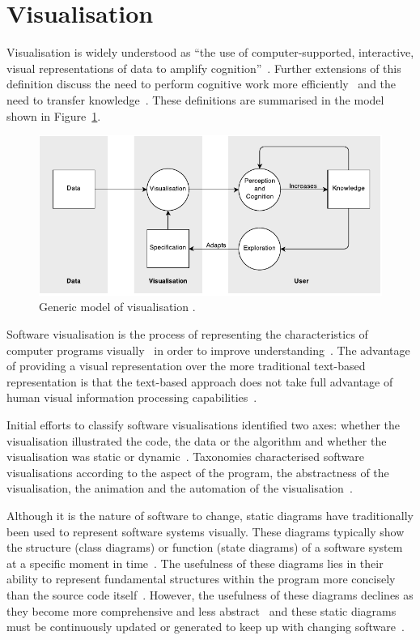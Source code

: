 \section{Visualisation}

Visualisation is widely understood as ``the use of computer-supported, interactive, visual representations of data to amplify cognition''~\cite{Card1999}. Further extensions of this definition discuss the need to perform cognitive work more efficiently~\cite{Ware2013a} and the need to transfer knowledge~\cite{Burkhard}. These definitions are summarised in the model shown in Figure~\ref{fig:model-of-visualisation}.

\begin{figure}
  \centering \includegraphics[width=\columnwidth]{../images/diagrams/wijk-model-of-visualisation.pdf}
  \caption{Generic model of visualisation \protect\cite{VanWijk2005}.}
\label{fig:model-of-visualisation}
\end{figure}

Software visualisation is the process of representing the characteristics of computer programs visually~\cite{Stasko1992} in order to improve understanding~\cite{Diehl2007}. The advantage of providing a visual representation over the more traditional text-based representation is that the text-based approach does not take full advantage of human visual information processing capabilities~\cite{Myers1989}.

Initial efforts to classify software visualisations identified two axes: whether the visualisation illustrated the code, the data or the algorithm and whether the visualisation was static or dynamic~\cite{Myers1989}. Taxonomies characterised software visualisations according to the aspect of the program, the abstractness of the visualisation, the animation and the automation of the visualisation~\cite{Stasko1992}.

Although it is the nature of software to change, static diagrams have traditionally been used to represent software systems visually. These diagrams typically show the structure (class diagrams) or function (state diagrams) of a software system at a specific moment in time~\cite{Rumbaugh2004}. The usefulness of these diagrams lies in their ability to represent fundamental structures within the program more concisely than the source code itself~. However, the usefulness of these diagrams declines as they become more comprehensive and less abstract~ and these static diagrams must be continuously updated or generated to keep up with changing software~.

